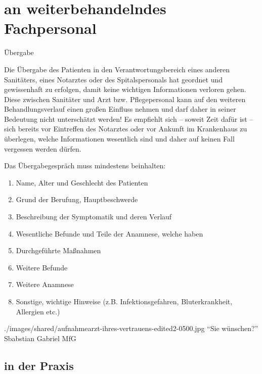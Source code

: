 

\section{ an weiterbehandelndes Fachpersonal}  

\TextSlideTeaser
{Übergabe}%
{%
Die Übergabe des Patienten in den Verantwortungsbereich
eines anderen Sanitäters, eines Notarztes oder des
Spitalspersonals hat geordnet und gewissenhaft zu erfolgen,
damit keine wichtigen Informationen verloren gehen. Diese
 zwischen Sanitäter und Arzt bzw.
Pflegepersonal kann auf den weiteren Behandlungsverlauf
einen großen Einfluss nehmen und darf daher in seiner
Bedeutung nicht unterschätzt werden! Es empfiehlt sich --
soweit Zeit dafür ist -- sich bereits vor Eintreffen des
Notarztes oder vor Ankunft im Krankenhaus zu überlegen, welche
Informationen wesentlich sind und daher auf keinen Fall
vergessen werden dürfen.

\bigskip\noindent Das Übergabegespräch muss mindestens
 beinhalten:
\begin{enumerate}
    \item Name, Alter und Geschlecht des
    Patienten
    \item Grund der Berufung, Hauptbeschwerde
    \item Beschreibung der Symptomatik und deren Verlauf
    \item Wesentliche Befunde und Teile der Anamnese, welche
     haben
    \item Durchgeführte Maßnahmen
    \item Weitere Befunde 
    \item Weitere Anamnese
    \item Sonstige, wichtige Hinweise (z.B. Infektionsgefahren,
    Bluterkrankheit, Allergien etc.)
\end{enumerate}}%
{}%
{./images/shared/aufnahmearzt-ihres-vertrauens-edited2-0500.jpg}%
{\enquote{Sie wünschen?}}%
{}%
{Sbabstian Gabriel}%
{MfG}%



\subsection{ in der Praxis}

